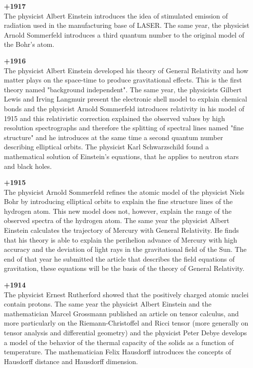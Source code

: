 \textbf{+1917}\\
The physicist Albert Einstein introduces the idea of stimulated emission of radiation used in the manufacturing base of LASER. The same year, the physicist Arnold Sommerfeld introduces a third quantum number to the original model of the Bohr's atom.

\textbf{+1916}\\
The physicist Albert Einstein developed his theory of General Relativity and how matter plays on the space-time to produce gravitational effects. This is the first theory named "background independent". The same year, the physicists Gilbert Lewis and Irving Langmuir present the electronic shell model to explain chemical bonds and the physicist Arnold Sommerfeld introduces relativity in his model of 1915 and this relativistic correction explained the observed values by high resolution spectrographs and therefore the splitting of spectral lines named "fine structure" and he introduces at the same time a second quantum number describing elliptical orbits. The physicist Karl Schwarzschild found a mathematical solution of Einstein's equations, that he applies to neutron stars and black holes.

\textbf{+1915}\\
The physicist Arnold Sommerfeld refines the atomic model of the physicist Niels Bohr by introducing elliptical orbits to explain the fine structure lines of the hydrogen atom. This new model does not, however, explain the range of the observed spectra of the hydrogen atom. The same year the physicist Albert Einstein calculates the trajectory of Mercury with General Relativity. He finds that his theory is able to explain the perihelion advance of Mercury with high accuracy and the deviation of light rays in the gravitational field of the Sun. The end of that year he submitted the article that describes the field equations of gravitation, these equations will be the basis of the theory of General Relativity.

\textbf{+1914}\\
The physicist Ernest Rutherford showed that the positively charged atomic nuclei contain protons. The same year the physicist Albert Einstein and the mathematician Marcel Grossmann published an article on tensor calculus, and more particularly on the Riemann-Christoffel and Ricci tensor (more generally on tensor analysis and differential geometry) and the physicist Peter Debye develops a model of the behavior of the thermal capacity of the solids as a function of temperature. The mathematician Felix Hausdorff introduces the concepts of Hausdorff distance and Hausdorff dimension.

